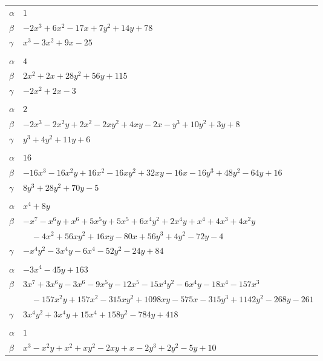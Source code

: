\documentclass[11pt]{article}
\begin{document}
\begin{longtable}{@{}ll@{}}
$\alpha$ & $1$\\
$\beta$ & $-2x^{3}+6x^{2}-17x+7y^{2}+14y+78$\\
$\gamma$ & $x^{3}-3x^{2}+9x-25$\\
\addlinespace[3pt]
\multicolumn{2}{@{}l}{$\{i,j\}=\{4,18\}$, $k_{ij}=3\cdot 7\cdot 11$}\\
$\alpha$ & $4$\\
$\beta$ & $2x^{2}+2x+28y^{2}+56y+115$\\
$\gamma$ & $-2x^{2}+2x-3$\\
\addlinespace[3pt]
\multicolumn{2}{@{}l}{$\{i,j\}=\{5,6\}$, $k_{ij}=2^{4}$}\\
$\alpha$ & $2$\\
$\beta$ & $-2x^{3}-2x^{2}y+2x^{2}-2xy^{2}+4xy-2x-y^{3}+10y^{2}+3y+8$\\
$\gamma$ & $y^{3}+4y^{2}+11y+6$\\
\addlinespace[3pt]
\multicolumn{2}{@{}l}{$\{i,j\}=\{5,8\}$, $k_{ij}=3^{3}$}\\
$\alpha$ & $16$\\
$\beta$ & $-16x^{3}-16x^{2}y+16x^{2}-16xy^{2}+32xy-16x-16y^{3}+48y^{2}-64y+16$\\
$\gamma$ & $8y^{3}+28y^{2}+70y-5$\\
\addlinespace[3pt]
\multicolumn{2}{@{}l}{$\{i,j\}=\{5,12\}$, $k_{ij}=2^{4}\cdot 5$}\\
$\alpha$ & $x^{4}+8y$\\
$\beta$ & $-x^{7}-x^{6}y+x^{6}+5x^{5}y+5x^{5}+6x^{4}y^{2}+2x^{4}y+x^{4}+4x^{3}+4x^{2}y$\\
 & $\quad -4x^{2}+56xy^{2}+16xy-80x+56y^{3}+4y^{2}-72y-4$\\
$\gamma$ & $-x^{4}y^{2}-3x^{4}y-6x^{4}-52y^{2}-24y+84$\\
\addlinespace[3pt]
\multicolumn{2}{@{}l}{$\{i,j\}=\{5,19\}$, $k_{ij}=2^{6}\cdot 5$}\\
$\alpha$ & $-3x^{4}-45y+163$\\
$\beta$ & $3x^{7}+3x^{6}y-3x^{6}-9x^{5}y-12x^{5}-15x^{4}y^{2}-6x^{4}y-18x^{4}-157x^{3}$\\
 & $\quad -157x^{2}y+157x^{2}-315xy^{2}+1098xy-575x-315y^{3}+1142y^{2}-268y-261$\\
$\gamma$ & $3x^{4}y^{2}+3x^{4}y+15x^{4}+158y^{2}-784y+418$\\
\addlinespace[3pt]
\multicolumn{2}{@{}l}{$\{i,j\}=\{6,15\}$, $k_{ij}=2^{2}\cdot 5$}\\
$\alpha$ & $1$\\
$\beta$ & $x^{3}-x^{2}y+x^{2}+xy^{2}-2xy+x-2y^{3}+2y^{2}-5y+10$\\

\end{longtable}
\end{document}
